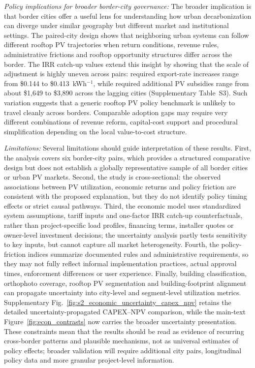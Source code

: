 \documentclass[pdflatex,sn-nature]{sn-jnl}
\begin{document}
\emph{Policy implications for broader border-city governance:} The broader implication is that border cities offer a useful lens for understanding how urban decarbonization can diverge under similar geography but different market and institutional settings. The paired-city design shows that neighboring urban systems can follow different rooftop PV trajectories when return conditions, revenue rules, administrative frictions and rooftop opportunity structures differ across the border. The IRR catch-up values extend this insight by showing that the scale of adjustment is highly uneven across pairs: required export-rate increases range from \$0.144 to \$0.413~kWh$^{-1}$, while required additional PV subsidies range from about \$1,649 to \$3,890 across the lagging cities (Supplementary Table~S3). Such variation suggests that a generic rooftop PV policy benchmark is unlikely to travel cleanly across borders. Comparable adoption gaps may require very different combinations of revenue reform, capital-cost support and procedural simplification depending on the local value-to-cost structure.


\emph{Limitations:} Several limitations should guide interpretation of these results. First, the analysis covers six border-city pairs, which provides a structured comparative design but does not establish a globally representative sample of all border cities or urban PV markets. Second, the study is cross-sectional: the observed associations between PV utilization, economic returns and policy friction are consistent with the proposed explanation, but they do not identify policy timing effects or strict causal pathways. Third, the economic model uses standardized system assumptions, tariff inputs and one-factor IRR catch-up counterfactuals, rather than project-specific load profiles, financing terms, installer quotes or owner-level investment decisions; the uncertainty analysis partly tests sensitivity to key inputs, but cannot capture all market heterogeneity. Fourth, the policy-friction indices summarize documented rules and administrative requirements, so they may not fully reflect informal implementation practices, actual approval times, enforcement differences or user experience. Finally, building classification, orthophoto coverage, rooftop PV segmentation and building-footprint alignment can propagate uncertainty into city-level and segment-level utilization metrics. Supplementary Fig.~\ref{fig:s2_economic_uncertainty_capex_npv} retains the detailed uncertainty-propagated CAPEX--NPV comparison, while the main-text Figure~\ref{fig:econ_contrasts} now carries the broader uncertainty presentation. These constraints mean that the results should be read as evidence of recurring cross-border patterns and plausible mechanisms, not as universal estimates of policy effects; broader validation will require additional city pairs, longitudinal policy data and more granular project-level information.
\end{document}
